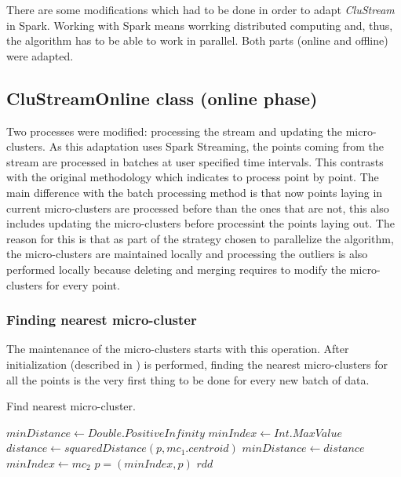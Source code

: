 There are some modifications which had to be done in order to adapt \textit{CluStream} in Spark. Working with Spark means worrking distributed computing and, thus, the algorithm has to be able to work in parallel. Both parts (online and offline) were adapted.

\subsection{CluStreamOnline class (online phase)}

Two processes were modified: processing the stream and updating the micro-clusters. As this adaptation uses Spark Streaming, the points coming from the stream are processed in batches at user specified time intervals. This contrasts with the original methodology which indicates to process point by point. The main difference with the batch processing method is that now points laying in current micro-clusters are processed before than the ones that are not, this also includes updating the micro-clusters before processint the points laying out. The reason for this is that as part of the strategy chosen to parallelize the algorithm, the micro-clusters are maintained locally and processing the outliers is also performed locally because deleting and merging requires to modify the micro-clusters for every point.

\subsubsection{Finding nearest micro-cluster}

The maintenance of the micro-clusters starts with this operation. After initialization (described in \cite{clustreamOrig}) is performed, finding the nearest micro-clusters for all the points is the very first thing to be done for every new batch of data.

\begin{algorithm}
 \caption{Find nearest micro-cluster.}\label{alg:assign}
 \begin{algorithmic}[1]
  \vspace{10pt}
  \State $minDistance \gets Double.PositiveInfinity$
  \State $minIndex \gets Int.MaxValue$
  \State $distance \gets squaredDistance(p, mc_1.centroid)$
  \State $minDistance \gets distance$
  \State $minIndex \gets mc_2$
  \EndIf
  \EndFor
  \State $p = (minIndex,p)$
  \EndFor
  \Return $rdd$
 \end{algorithmic}
\end{algorithm}

